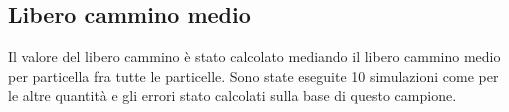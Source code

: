 \subsection{Libero cammino medio}
Il valore del libero cammino è stato calcolato mediando il libero cammino medio per particella fra tutte le particelle. Sono state eseguite 10 simulazioni come per le altre quantità e gli errori stato calcolati sulla base di questo campione.
\begin{center}
	\begin{figure}[h]
	\centering
\end{figure}
\end{center}
